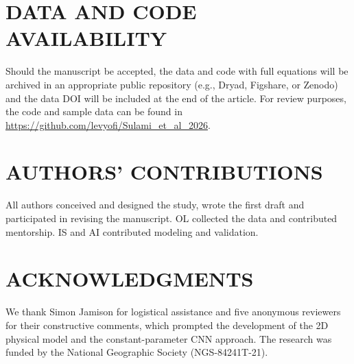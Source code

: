 \documentclass[12pt]{article}
\begin{document}
\section*{DATA AND CODE AVAILABILITY}
\noindent Should the manuscript be accepted, the data and code with full equations will be archived in an appropriate public repository (e.g., Dryad, Figshare, or Zenodo) and the data DOI will be included at the end of the article. For review purposes, the code and sample data can be found in \url{https://github.com/levyofi/Sulami_et_al_2026}.

\section*{AUTHORS' CONTRIBUTIONS}
\noindent All authors conceived and designed the study, wrote the first draft and participated in revising the manuscript. OL collected the data and contributed mentorship. IS and AI contributed modeling and validation.


\section*{ACKNOWLEDGMENTS}
\noindent We thank Simon Jamison for logistical assistance and five anonymous reviewers for their constructive comments, which prompted the development of the 2D physical model and the constant-parameter CNN approach. The research was funded by the National Geographic Society (NGS-84241T-21).

\newpage


\end{document}
